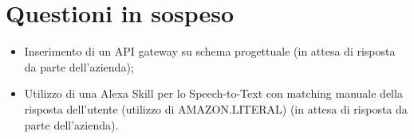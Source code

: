 \documentclass[../verbale-2017-02-21.tex]{subfiles}
\begin{document}
	\section{Questioni in sospeso} 
	\begin{itemize}
		\item Inserimento di un API gateway su schema progettuale (in attesa di risposta da parte dell'azienda);
		\item Utilizzo di una Alexa Skill per lo Speech-to-Text con matching manuale della risposta dell'utente (utilizzo di AMAZON.LITERAL) (in attesa di risposta da parte dell'azienda).
	\end{itemize}
\end{document}
